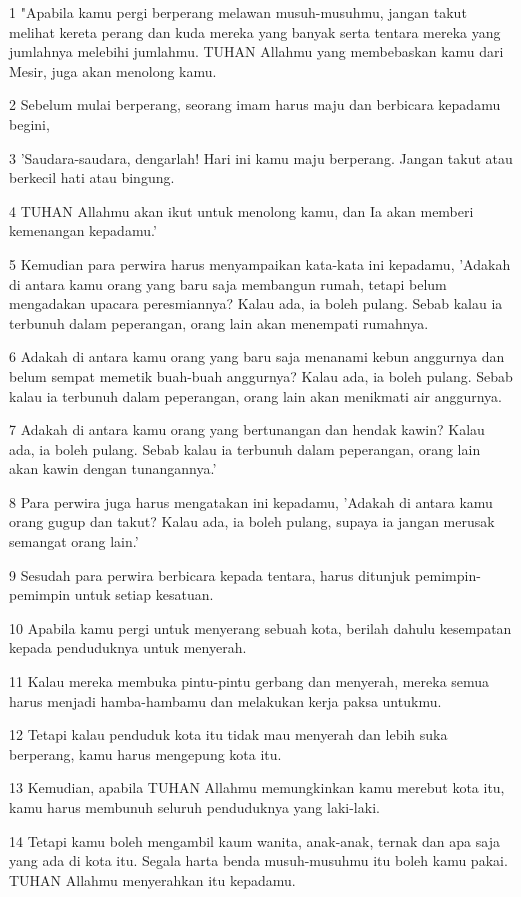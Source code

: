 \par 1 "Apabila kamu pergi berperang melawan musuh-musuhmu, jangan takut melihat kereta perang dan kuda mereka yang banyak serta tentara mereka yang jumlahnya melebihi jumlahmu. TUHAN Allahmu yang membebaskan kamu dari Mesir, juga akan menolong kamu.
\par 2 Sebelum mulai berperang, seorang imam harus maju dan berbicara kepadamu begini,
\par 3 'Saudara-saudara, dengarlah! Hari ini kamu maju berperang. Jangan takut atau berkecil hati atau bingung.
\par 4 TUHAN Allahmu akan ikut untuk menolong kamu, dan Ia akan memberi kemenangan kepadamu.'
\par 5 Kemudian para perwira harus menyampaikan kata-kata ini kepadamu, 'Adakah di antara kamu orang yang baru saja membangun rumah, tetapi belum mengadakan upacara peresmiannya? Kalau ada, ia boleh pulang. Sebab kalau ia terbunuh dalam peperangan, orang lain akan menempati rumahnya.
\par 6 Adakah di antara kamu orang yang baru saja menanami kebun anggurnya dan belum sempat memetik buah-buah anggurnya? Kalau ada, ia boleh pulang. Sebab kalau ia terbunuh dalam peperangan, orang lain akan menikmati air anggurnya.
\par 7 Adakah di antara kamu orang yang bertunangan dan hendak kawin? Kalau ada, ia boleh pulang. Sebab kalau ia terbunuh dalam peperangan, orang lain akan kawin dengan tunangannya.'
\par 8 Para perwira juga harus mengatakan ini kepadamu, 'Adakah di antara kamu orang gugup dan takut? Kalau ada, ia boleh pulang, supaya ia jangan merusak semangat orang lain.'
\par 9 Sesudah para perwira berbicara kepada tentara, harus ditunjuk pemimpin-pemimpin untuk setiap kesatuan.
\par 10 Apabila kamu pergi untuk menyerang sebuah kota, berilah dahulu kesempatan kepada penduduknya untuk menyerah.
\par 11 Kalau mereka membuka pintu-pintu gerbang dan menyerah, mereka semua harus menjadi hamba-hambamu dan melakukan kerja paksa untukmu.
\par 12 Tetapi kalau penduduk kota itu tidak mau menyerah dan lebih suka berperang, kamu harus mengepung kota itu.
\par 13 Kemudian, apabila TUHAN Allahmu memungkinkan kamu merebut kota itu, kamu harus membunuh seluruh penduduknya yang laki-laki.
\par 14 Tetapi kamu boleh mengambil kaum wanita, anak-anak, ternak dan apa saja yang ada di kota itu. Segala harta benda musuh-musuhmu itu boleh kamu pakai. TUHAN Allahmu menyerahkan itu kepadamu.
